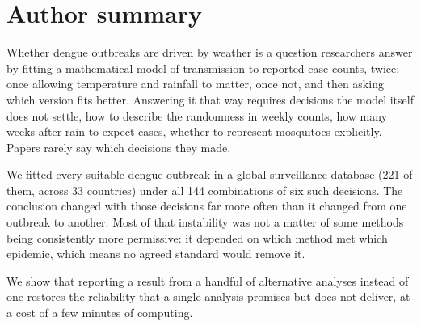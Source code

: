 %
%

\section*{Author summary}

Whether dengue outbreaks are driven by weather is a question researchers answer
by fitting a mathematical model of transmission to reported case counts, twice:
once allowing temperature and rainfall to matter, once not, and then asking which
version fits better. Answering it that way requires decisions the model itself
does not settle, how to describe the randomness in weekly counts, how many
weeks after rain to expect cases, whether to represent mosquitoes explicitly.
Papers rarely say which decisions they made.

We fitted every suitable dengue outbreak in a global surveillance database (221 of them, across 33 countries) under all 144 combinations of six such
decisions. The conclusion changed with those decisions far more often than it
changed from one outbreak to another. Most of that instability was not a matter
of some methods being consistently more permissive: it depended on which method
met which epidemic, which means no agreed standard would remove it.

We show that reporting a result from a handful of alternative analyses instead
of one restores the reliability that a single analysis promises but does not
deliver, at a cost of a few minutes of computing.
